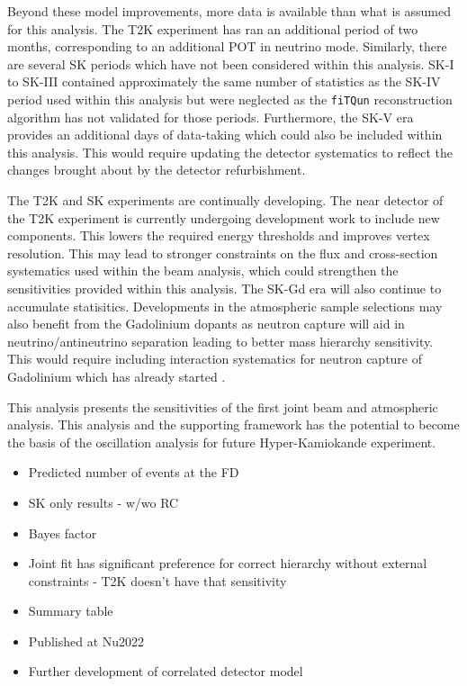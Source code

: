Beyond these model improvements, more data is available than what is assumed for this analysis. The T2K experiment has ran an additional period of two months, corresponding to an additional POT in neutrino mode. Similarly, there are several SK periods which have not been considered within this analysis. SK-I to SK-III contained approximately the same number of statistics as the SK-IV period used within this analysis but were neglected as the \texttt{fiTQun} reconstruction algorithm has not validated for those periods. Furthermore, the SK-V era provides an additional  days of data-taking which could also be included within this analysis. This would require updating the detector systematics to reflect the changes brought about by the detector refurbishment.

The T2K and SK experiments are continually developing. The near detector of the T2K experiment is currently undergoing development work to include new components. This lowers the required energy thresholds and improves vertex resolution. This may lead to stronger constraints on the flux and cross-section systematics used within the beam analysis, which could strengthen the sensitivities provided within this analysis. The SK-Gd era will also continue to accumulate statisitics. Developments in the atmospheric sample selections may also benefit from the Gadolinium dopants as neutron capture will aid in neutrino/antineutrino separation leading to better mass hierarchy sensitivity. This would require including interaction systematics for neutron capture of Gadolinium which has already started .

This analysis presents the sensitivities of the first joint beam and atmospheric analysis. This analysis and the supporting framework has the potential to become the basis of the oscillation analysis for future Hyper-Kamiokande experiment.

\begin{itemize}
\item Predicted number of events at the FD
\item SK only results - w/wo RC
\item Bayes factor
\item Joint fit has significant preference for correct hierarchy without external constraints - T2K doesn't have that sensitivity
\item Summary table
\item Published at Nu2022
  
\item Further development of correlated detector model

\end{itemize}
